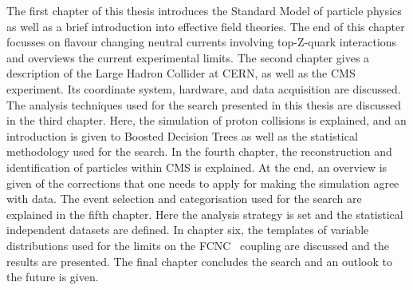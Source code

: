 The first chapter of this thesis introduces the Standard Model of particle physics as well as a brief introduction into effective field theories. The end of this chapter focusses on flavour changing neutral currents involving top-Z-quark interactions and overviews the current experimental limits.  The second chapter gives a description of the Large Hadron Collider at CERN, as well as the CMS experiment. Its coordinate system, hardware, and data acquisition are discussed. The analysis techniques used for the search  presented in this thesis are discussed in the third chapter. Here, the simulation of proton collisions is explained, and an introduction is given to Boosted Decision Trees as well as the statistical methodology used for the search. In the fourth chapter, the reconstruction and identification of particles within CMS is explained. At the end, an overview is given of the corrections that one needs to apply for making the simulation agree with data. The event selection and categorisation used for the search are explained in the fifth chapter. Here the analysis strategy is set and the statistical independent datasets are defined. In chapter six, the templates of variable distributions used for the limits on the FCNC \tZq\ coupling are discussed and the results are presented. The final chapter concludes the search and an outlook to the future is given. 